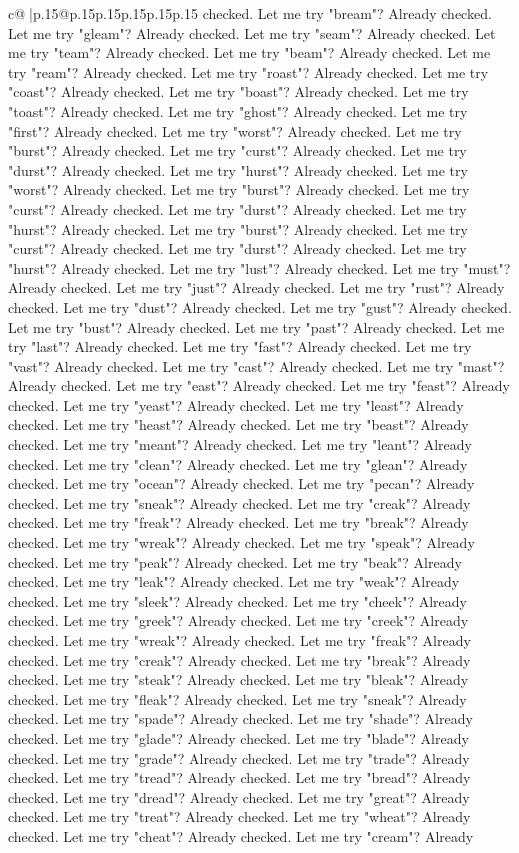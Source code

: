 \documentclass{article}
\begin{document}
{\begin{supertabular}{c@{$\;$}|p{.15\linewidth}@{}p{.15\linewidth}p{.15\linewidth}p{.15\linewidth}p{.15\linewidth}p{.15\linewidth}}
{{{checked. Let me try "bream"? Already checked. Let me try "gleam"? Already checked. Let me try "seam"? Already checked. Let me try "team"? Already checked. Let me try "beam"? Already checked. Let me try "ream"? Already checked. Let me try "roast"? Already checked. Let me try "coast"? Already checked. Let me try "boast"? Already checked. Let me try "toast"? Already checked. Let me try "ghost"? Already checked. Let me try "first"? Already checked. Let me try "worst"? Already checked. Let me try "burst"? Already checked. Let me try "curst"? Already checked. Let me try "durst"? Already checked. Let me try "hurst"? Already checked. Let me try "worst"? Already checked. Let me try "burst"? Already checked. Let me try "curst"? Already checked. Let me try "durst"? Already checked. Let me try "hurst"? Already checked. Let me try "burst"? Already checked. Let me try "curst"? Already checked. Let me try "durst"? Already checked. Let me try "hurst"? Already checked. Let me try "lust"? Already checked. Let me try "must"? Already checked. Let me try "just"? Already checked. Let me try "rust"? Already checked. Let me try "dust"? Already checked. Let me try "gust"? Already checked. Let me try "bust"? Already checked. Let me try "past"? Already checked. Let me try "last"? Already checked. Let me try "fast"? Already checked. Let me try "vast"? Already checked. Let me try "cast"? Already checked. Let me try "mast"? Already checked. Let me try "east"? Already checked. Let me try "feast"? Already checked. Let me try "yeast"? Already checked. Let me try "least"? Already checked. Let me try "heast"? Already checked. Let me try "beast"? Already checked. Let me try "meant"? Already checked. Let me try "leant"? Already checked. Let me try "clean"? Already checked. Let me try "glean"? Already checked. Let me try "ocean"? Already checked. Let me try "pecan"? Already checked. Let me try "sneak"? Already checked. Let me try "creak"? Already checked. Let me try "freak"? Already checked. Let me try "break"? Already checked. Let me try "wreak"? Already checked. Let me try "speak"? Already checked. Let me try "peak"? Already checked. Let me try "beak"? Already checked. Let me try "leak"? Already checked. Let me try "weak"? Already checked. Let me try "sleek"? Already checked. Let me try "cheek"? Already checked. Let me try "greek"? Already checked. Let me try "creek"? Already checked. Let me try "wreak"? Already checked. Let me try "freak"? Already checked. Let me try "creak"? Already checked. Let me try "break"? Already checked. Let me try "steak"? Already checked. Let me try "bleak"? Already checked. Let me try "fleak"? Already checked. Let me try "sneak"? Already checked. Let me try "spade"? Already checked. Let me try "shade"? Already checked. Let me try "glade"? Already checked. Let me try "blade"? Already checked. Let me try "grade"? Already checked. Let me try "trade"? Already checked. Let me try "tread"? Already checked. Let me try "bread"? Already checked. Let me try "dread"? Already checked. Let me try "great"? Already checked. Let me try "treat"? Already checked. Let me try "wheat"? Already checked. Let me try "cheat"? Already checked. Let me try "cream"? Already }}}
\end{supertabular}}
\end{document}
